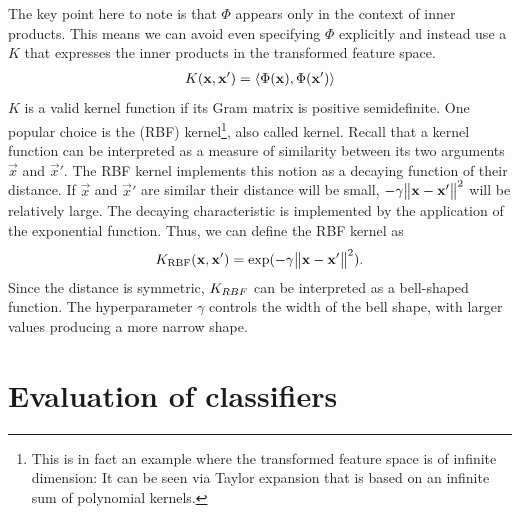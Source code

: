 \documentclass[
	fontsize=10pt, %
	twoside=false, %
	secnumdepth=1, %
]{kaobook}
\begin{document}
The key point here to note is that $\Phi$ appears only in the context of inner
products. This means we can avoid even specifying $\Phi$ explicitly and instead
use a  $K$ that expresses the inner products in the
transformed feature space.
\begin{align*}
  K(\mathbf{x}, \mathbf{x}') = \langle \Phi(\mathbf{x}), \Phi(\mathbf{x}') \rangle
\end{align*}
$K$ is a valid kernel function if its Gram matrix is positive semidefinite. One
popular choice is the  (RBF) kernel\footnote{This is in fact an example where the transformed feature space is of
  infinite dimension: It can be seen via Taylor expansion that \Krbf is based on
  an infinite sum of polynomial kernels.
}, also called  kernel. Recall that a kernel function can be
interpreted as a measure of similarity between its two arguments $\vec x$ and
$\vec x'$. The RBF kernel implements this notion as a decaying function of their
distance. If $\vec x$ and $\vec x'$ are similar their distance will be small, $-
\gamma \norm{\mathbf{x} - \mathbf{x}'}^2$ will be relatively large. The decaying
characteristic is implemented by the application of the exponential function.
Thus, we can define the RBF kernel as
\begin{align}
  K_{\text{RBF}} (\mathbf{x}, \mathbf{x}') = \exp( -\gamma \norm{\mathbf{x} - \mathbf{x}'}^2 ).
  \label{eq:rbf-kernel}
\end{align}
Since the distance is symmetric, $K_{RBF}$ can be interpreted as a bell-shaped
function.
The hyperparameter $\gamma$ controls the width of the bell shape, with
larger values producing a more narrow shape. 




\section{Evaluation of classifiers}
\end{document}
